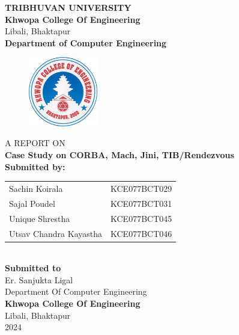 \begin{center}
    \thispagestyle{empty}
    \Large\textbf{TRIBHUVAN UNIVERSITY}\\
    \vspace{0.2in}
    \large{\textbf{Khwopa College Of Engineering}\\}
    \normalsize{Libali, Bhaktapur\\}\vspace{0.2in}
    \large\textbf{Department of Computer Engineering}\\
    \begin{figure}[h]
        \centering
            \includegraphics[width=0.27\textwidth]{Images/khwopalogo.jpg}
    \end{figure}
    \vspace{0.2in}
    \large{A REPORT ON\\ \vspace{0.1in} \textbf{Case Study on CORBA, Mach, Jini, TIB/Rendezvous }\\
    }
    \vspace{0.4in}
    \large{\textbf{Submitted by:}}\\
    \vspace{0.1in}
    \begin{tabular}{p{3.5in}p{2in}}
        \hspace{0.3cm}Sachin Koirala& \hspace{1cm}KCE077BCT029\\
        \hspace{0.3cm}Sajal Poudel& \hspace{1cm}KCE077BCT031\\
        \hspace{0.3cm}Unique Shrestha& \hspace{1cm}KCE077BCT045\\
        \hspace{0.3cm}Utsav Chandra Kayastha& \hspace{1cm}KCE077BCT046\\
    \end{tabular}
    \\
    \vspace{0.6in}
    \large{\textbf{Submitted to}}\\
      Er. Sanjukta Ligal\\
      Department Of Computer Engineering\\
    \vspace{1cm}
        \vspace{0.8cm}
    \large{\textbf{Khwopa College Of Engineering}\\}
        \normalsize{Libali, Bhaktapur\\
        2024
    }
\end{center}
